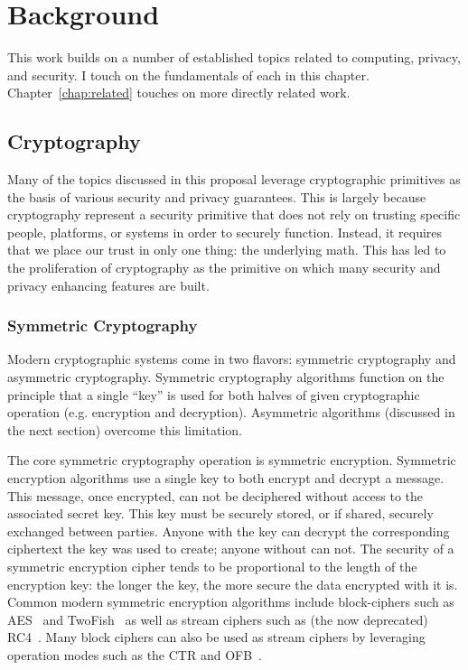 \chapter{Background}
\label{chap:background}

This work builds on a number of established topics related to
computing, privacy, and security. I touch on the fundamentals of each
in this chapter. Chapter~\ref{chap:related} touches on more directly
related work.

\section{Cryptography}
\label{chap:background:crypto}

Many of the topics discussed in this proposal leverage cryptographic
primitives as the basis of various security and privacy
guarantees. This is largely because cryptography represent a security
primitive that does not rely on trusting specific people, platforms,
or systems in order to securely function. Instead, it requires that we
place our trust in only one thing: the underlying math. This has led
to the proliferation of cryptography as the primitive on which many
security and privacy enhancing features are built.

\subsection{Symmetric Cryptography}

Modern cryptographic systems come in two flavors: symmetric
cryptography and asymmetric cryptography. Symmetric cryptography
algorithms function on the principle that a single ``key'' is used for
both halves of given cryptographic operation (e.g. encryption and
decryption). Asymmetric algorithms (discussed in the next section)
overcome this limitation.

The core symmetric cryptography operation is symmetric
encryption. Symmetric encryption algorithms use a single key to both
encrypt and decrypt a message. This message, once encrypted, can not
be deciphered without access to the associated secret key. This key
must be securely stored, or if shared, securely exchanged between
parties. Anyone with the key can decrypt the corresponding ciphertext
the key was used to create; anyone without can not. The security of a
symmetric encryption cipher tends to be proportional to the length of
the encryption key: the longer the key, the more secure the data
encrypted with it is. Common modern symmetric encryption algorithms
include block-ciphers such as AES~\cite{nist2001} and
TwoFish~\cite{schneier1998} as well as stream ciphers such as (the now
deprecated) RC4~\cite{rc4-source}. Many block ciphers can also be used
as stream ciphers by leveraging operation modes such as the CTR and
OFB~\cite{schneier2010crypto}.

